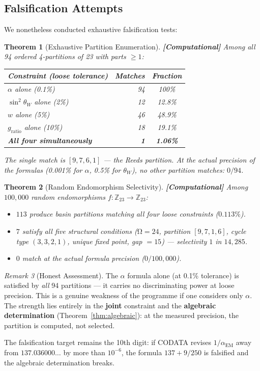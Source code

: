 \documentclass[12pt,a4paper]{article}
\newcommand{\computational}[1]{\textcolor{computational}{\textbf{[Computational]}} #1}
\newtheorem{theorem}{Theorem}[section]
\theoremstyle{definition}\newtheorem{definition}[theorem]{Definition}
\theoremstyle{remark}\newtheorem{remark}[theorem]{Remark}
\renewcommand{\O}{\mathrm{\Omega}}
\newcommand{\Zp}{\mathbb{Z}_{23}}
\begin{document}
\subsection{Falsification Attempts}

We nonetheless conducted exhaustive falsification tests:

\begin{theorem}[Exhaustive Partition Enumeration]
\label{thm:exhaustive}
\computational{Among all 94 ordered 4-partitions of 23 with parts $\geq 1$:}
\begin{center}
\begin{tabular}{lrc}
\toprule
\textbf{Constraint (loose tolerance)} & \textbf{Matches} & \textbf{Fraction} \\
\midrule
$\alpha$ alone (0.1\%) & 94 & 100\% \\
$\sin^2\theta_W$ alone (2\%) & 12 & 12.8\% \\
$w$ alone (5\%) & 46 & 48.9\% \\
$g_{\mathrm{ratio}}$ alone (10\%) & 18 & 19.1\% \\
\midrule
\textbf{All four simultaneously} & \textbf{1} & \textbf{1.06\%} \\
\bottomrule
\end{tabular}
\end{center}
The single match is $[9, 7, 6, 1]$ --- the Reeds partition. At the actual
precision of the formulas (0.001\% for $\alpha$, 0.5\% for $\theta_W$), no
other partition matches: $0/94$.
\end{theorem}

\begin{theorem}[Random Endomorphism Selectivity]
\label{thm:endo_select}
\computational{Among $100{,}000$ random endomorphisms $f: \Zp \to \Zp$:}
\begin{itemize}
  \item $113$ produce basin partitions matching all four loose constraints ($0.113\%$).
  \item $7$ satisfy all five structural conditions ($\O = 24$, partition
  $[9,7,1,6]$, cycle type $(3,3,2,1)$, unique fixed point, gap $= 15$) ---
  selectivity $1$ in $14{,}285$.
  \item $0$ match at the actual formula precision ($0/100{,}000$).
\end{itemize}
\end{theorem}

\begin{remark}[Honest Assessment]
The $\alpha$ formula alone (at 0.1\% tolerance) is satisfied by \emph{all} 94
partitions --- it carries no discriminating power at loose precision. This is a
genuine weakness of the programme if one considers only $\alpha$. The strength
lies entirely in the \textbf{joint} constraint and the
\textbf{algebraic determination} (Theorem~\ref{thm:algebraic}): at the measured
precision, the partition is computed, not selected.

The falsification target remains the 10th digit: if CODATA revises
$1/\alpha_{\mathrm{EM}}$ away from $137.036000\ldots$ by more than $10^{-6}$,
the formula $137 + 9/250$ is falsified and the algebraic determination breaks.
\end{remark}
\end{document}
